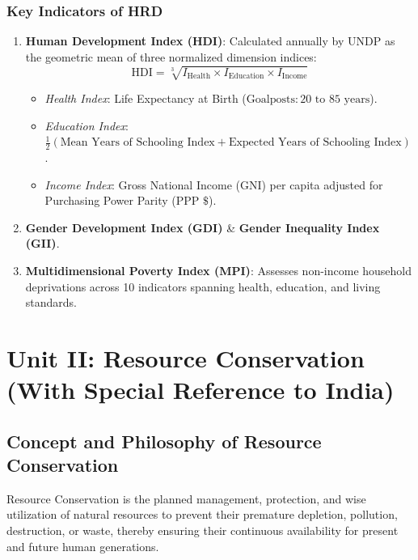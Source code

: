 \documentclass[11pt,a4paper]{article}
\begin{document}
\subsubsection{Key Indicators of HRD}
\begin{enumerate}[leftmargin=*]
  \item \textbf{Human Development Index (HDI)}: Calculated annually by UNDP as the geometric mean of three normalized dimension indices:
  \begin{equation}
    \text{HDI} = \sqrt[3]{I_{\text{Health}} \times I_{\text{Education}} \times I_{\text{Income}}}
  \end{equation}
  \begin{itemize}
    \item \textit{Health Index}: Life Expectancy at Birth ($\text{Goalposts}: 20 \text{ to } 85 \text{ years}$).
    \item \textit{Education Index}: $\frac{1}{2} (\text{Mean Years of Schooling Index} + \text{Expected Years of Schooling Index})$.
    \item \textit{Income Index}: Gross National Income (GNI) per capita adjusted for Purchasing Power Parity ($\text{PPP \$}$).
  \end{itemize}

  \item \textbf{Gender Development Index (GDI)} \& \textbf{Gender Inequality Index (GII)}.
  \item \textbf{Multidimensional Poverty Index (MPI)}: Assesses non-income household deprivations across 10 indicators spanning health, education, and living standards.
\end{enumerate}

\newpage
\section{Unit II: Resource Conservation (With Special Reference to India)}

\subsection{Concept and Philosophy of Resource Conservation}

\begin{defbox}
Resource Conservation is the planned management, protection, and wise utilization of natural resources to prevent their premature depletion, pollution, destruction, or waste, thereby ensuring their continuous availability for present and future human generations.
\end{defbox}
\end{document}
